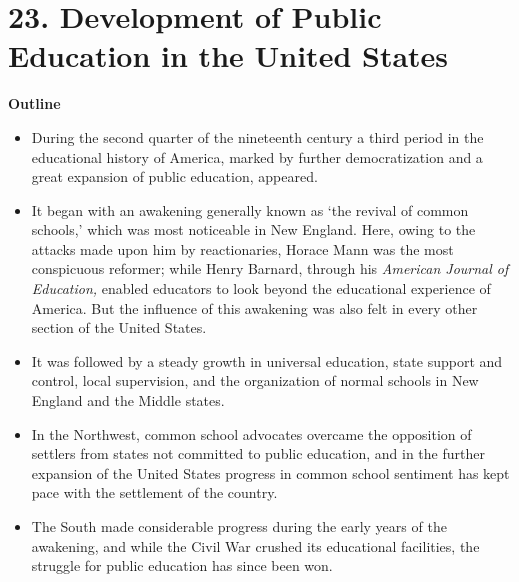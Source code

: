 \documentclass[]{book}
\providecommand{\tightlist}{%
  \setlength{\itemsep}{0pt}\setlength{\parskip}{0pt}}
\begin{document}
\hypertarget{development-of-public-education-in-the-united-states}{%
\chapter{23. Development of Public Education in the United States}\label{development-of-public-education-in-the-united-states}}

\textbf{Outline}

\begin{itemize}
\tightlist
\item
  During the second quarter of the nineteenth century a third period in the educational history of America, marked by further democratization and a great expansion of public education, appeared.
\item
  It began with an awakening generally known as `the revival of common schools,' which was most noticeable in New England. Here, owing to the attacks made upon him by reactionaries, Horace Mann was the most conspicuous reformer; while Henry Barnard, through his \emph{American Journal of Education,} enabled educators to look beyond the educational experience of America. But the influence of this awakening was also felt in every other section of the United States.
\item
  It was followed by a steady growth in universal education, state support and control, local supervision, and the organization of normal schools in New England and the Middle states.
\item
  In the Northwest, common school advocates overcame the opposition of settlers from states not committed to public education, and in the further expansion of the United States progress in common school sentiment has kept pace with the settlement of the country.
\item
  The South made considerable progress during the early years of the awakening, and while the Civil War crushed its educational facilities, the struggle for public education has since been won.
\end{itemize}
\end{document}
